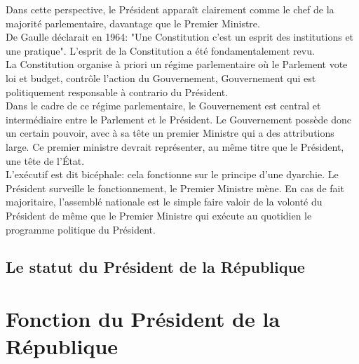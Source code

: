 \documentclass[12pt, a4paper, openany]{book}
\begin{document}
Dans cette perspective, le Président apparaît clairement comme le chef de la majorité parlementaire, davantage que le Premier Ministre. \\
De Gaulle déclarait en 1964: "Une Constitution c'est un esprit des institutions et une pratique". L'esprit de la Constitution a été fondamentalement revu. \\
La Constitution organise à priori un régime parlementaire où le Parlement vote loi et budget, contrôle l'action du Gouvernement, Gouvernement qui est politiquement responsable à contrario du Président. \\
Dans le cadre de ce régime parlementaire, le Gouvernement est central et intermédiaire entre le Parlement et le Président. Le Gouvernement possède donc un certain pouvoir, avec à sa tête un premier Ministre qui a des attributions large. Ce premier ministre devrait représenter, au même titre que le Président, une tête de l'État. \\
L'exécutif est dit bicéphale: cela fonctionne sur le principe d'une dyarchie. Le Président surveille le fonctionnement, le Premier Ministre mène. En cas de fait majoritaire, l'assemblé nationale est le simple faire valoir de la volonté du Président de même que le Premier Ministre qui exécute au quotidien le programme politique du Président. \\


\subsection{Le statut du Président de la République}


\section{Fonction du Président de la République}
\end{document}
